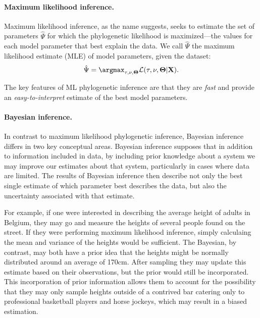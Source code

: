 \paragraph*{Maximum likelihood inference.}
Maximum likelihood inference, as the name suggests, seeks to estimate the set of parameters $\hat{\Psi}$ for which the phylogenetic likelihood is maximized---the values for each model parameter that best explain the data.
We call $\hat{\Psi}$ the maximum likelihood estimate (MLE) of model parameters, given the dataset:
\begin{equation}
  \hat{\Psi} = \argmax_{\tau,\mathbf{\nu},\mathbf{\Theta}} \mathcal{L}(\tau, \mathbf{\nu},\mathbf{\Theta} | \mathbf{X}).
\end{equation}

The key features of ML phylogenetic inference are that they are \textit{fast} and provide an \textit{easy-to-interpret} estimate of the best model parameters.

\paragraph*{Bayesian inference.}
In contrast to maximum likelihood phylogenetic inference, Bayesian inference differs in two key conceptual areas.
Bayesian inference supposes that in addition to information included in data, by including prior knowledge about a system we may improve our estimates about that system, particularly in cases where data are limited.
The results of Bayesian inference then describe not only the best single estimate of which parameter best describes the data, but also the uncertainty associated with that estimate.

For example, if one were interested in describing the average height of adults in Belgium, they may go and measure the heights of several people found on the street.
If they were performing maximum likelihood inference, simply calculaing the mean and variance of the heights would be sufficient.
The Bayesian, by contrast, may both have a prior idea that the heights might be normally distributed around an average of 170cm.
After sampling they may update this estimate based on their observations, but the prior would still be incorporated.
This incorporation of prior information allows them to account for the possibility that they may only sample heights outside of a contrived bar catering only to professional basketball players and horse jockeys, which may result in a biased estimation.

